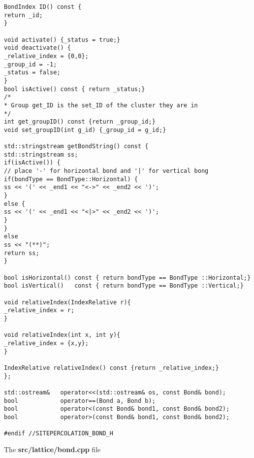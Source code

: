 \begin{lstlisting}[style=CStyle]
BondIndex ID() const {
return _id;
}

void activate() {_status = true;}
void deactivate() {
_relative_index = {0,0};
_group_id = -1;
_status = false;
}
bool isActive() const { return _status;}
/*
* Group get_ID is the set_ID of the cluster they are in
*/
int get_groupID() const {return _group_id;}
void set_groupID(int g_id) {_group_id = g_id;}

std::stringstream getBondString() const {
std::stringstream ss;
if(isActive()) {
// place '-' for horizontal bond and '|' for vertical bong
if(bondType == BondType::Horizontal) {
ss << '(' << _end1 << "<->" << _end2 << ')';
}
else {
ss << '(' << _end1 << "<|>" << _end2 << ')';
}
}
else
ss << "(**)";
return ss;
}

bool isHorizontal() const { return bondType == BondType ::Horizontal;}
bool isVertical()   const { return bondType == BondType ::Vertical;}

void relativeIndex(IndexRelative r){
_relative_index = r;
}

void relativeIndex(int x, int y){
_relative_index = {x,y};
}

IndexRelative relativeIndex() const {return _relative_index;}
};

std::ostream&   operator<<(std::ostream& os, const Bond& bond);
bool            operator==(Bond a, Bond b);
bool            operator<(const Bond& bond1, const Bond& bond2);
bool            operator>(const Bond& bond1, const Bond& bond2);

#endif //SITEPERCOLATION_BOND_H
\end{lstlisting}

The \textbf{src/lattice/bond.cpp} file

